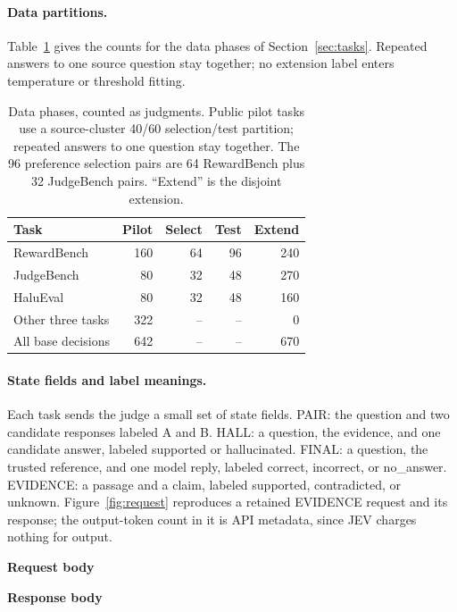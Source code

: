 \documentclass[11pt]{article}
\begin{document}
\paragraph{Data partitions.}
Table~\ref{tab:phases} gives the counts for the data phases of Section~\ref{sec:tasks}. Repeated answers to one source question stay together; no extension label enters temperature or threshold fitting.

\begin{table}[!htbp]
\centering\small\setlength{\tabcolsep}{3pt}
\begin{tabular}{@{}lrrrr@{}}\toprule
Task & Pilot & Select & Test & Extend \\\midrule
RewardBench & 160 & 64 & 96 & 240 \\
JudgeBench & 80 & 32 & 48 & 270 \\
HaluEval & 80 & 32 & 48 & 160 \\
Other three tasks & 322 & -- & -- & 0 \\\midrule
All base decisions & 642 & -- & -- & 670 \\\bottomrule
\end{tabular}
\caption{Data phases, counted as judgments. Public pilot tasks use a source-cluster 40/60 selection/test partition; repeated answers to one question stay together. The 96 preference selection pairs are 64 RewardBench plus 32 JudgeBench pairs. ``Extend'' is the disjoint extension.}
\label{tab:phases}
\end{table}


\paragraph{State fields and label meanings.}
Each task sends the judge a small set of state fields. PAIR: the question and two candidate responses labeled A and B. HALL: a question, the evidence, and one candidate answer, labeled supported or hallucinated. FINAL: a question, the trusted reference, and one model reply, labeled correct, incorrect, or no\_answer. EVIDENCE: a passage and a claim, labeled supported, contradicted, or unknown. Figure~\ref{fig:request} reproduces a retained EVIDENCE request and its response; the output-token count in it is API metadata, since JEV charges nothing for output.
\begin{appfigure}
\begin{minipage}[t]{.58\textwidth}
\textbf{Request body}\par

\end{minipage}\hfill
\begin{minipage}[t]{.39\textwidth}
\textbf{Response body}\par

\end{minipage}
\caption{An exact JEV request/response from the synthetic support condition, excluding transport headers. Instructions and label criteria are explicit; the hidden correctness label is absent from the request.}
\label{fig:request}
\end{appfigure}
\end{document}
